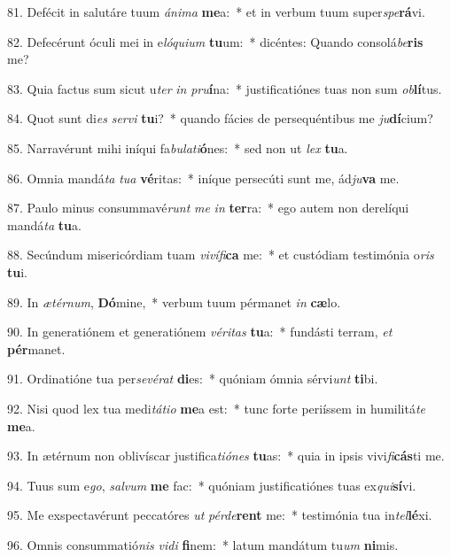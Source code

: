 81. Defécit in salutáre tuum \textit{á}\textit{ni}\textit{ma} \textbf{me}a:~*  et in verbum tuum super\textit{spe}\textbf{rá}vi.\

82. Defecérunt óculi mei in e\textit{ló}\textit{qui}\textit{um} \textbf{tu}um:~*  dicéntes: Quando consolá\textit{be}\textbf{ris} me?\

83. Quia factus sum sicut u\textit{ter} \textit{in} \textit{pru}\textbf{í}na:~*  justificatiónes tuas non sum \textit{ob}\textbf{lí}tus.\

84. Quot sunt di\textit{es} \textit{ser}\textit{vi} \textbf{tu}i?~*  quando fácies de persequéntibus me \textit{ju}\textbf{dí}cium?\

85. Narravérunt mihi iníqui fa\textit{bu}\textit{la}\textit{ti}\textbf{ó}nes:~*  sed non ut \textit{lex} \textbf{tu}a.\

86. Omnia mandá\textit{ta} \textit{tu}\textit{a} \textbf{vé}ritas:~*  iníque persecúti sunt me, ád\textit{ju}\textbf{va} me.\

87. Paulo minus consummavé\textit{runt} \textit{me} \textit{in} \textbf{ter}ra:~*  ego autem non derelíqui mandá\textit{ta} \textbf{tu}a.\

88. Secúndum misericórdiam tuam \textit{vi}\textit{ví}\textit{fi}\textbf{ca} me:~*  et custódiam testimónia o\textit{ris} \textbf{tu}i.\

89. In \textit{æ}\textit{tér}\textit{num}, \textbf{Dó}mine,~*  verbum tuum pérmanet \textit{in} \textbf{cæ}lo.\

90. In generatiónem et generatiónem \textit{vé}\textit{ri}\textit{tas} \textbf{tu}a:~*  fundásti terram, \textit{et} \textbf{pér}manet.\

91. Ordinatióne tua per\textit{se}\textit{vé}\textit{rat} \textbf{di}es:~*  quóniam ómnia sérvi\textit{unt} \textbf{ti}bi.\

92. Nisi quod lex tua medi\textit{tá}\textit{ti}\textit{o} \textbf{me}a est:~*  tunc forte periíssem in humilitá\textit{te} \textbf{me}a.\

93. In ætérnum non oblivíscar justifica\textit{ti}\textit{ó}\textit{nes} \textbf{tu}as:~*  quia in ipsis vivi\textit{fi}\textbf{cás}ti me.\

94. Tuus sum e\textit{go}, \textit{sal}\textit{vum} \textbf{me} fac:~*  quóniam justificatiónes tuas ex\textit{qui}\textbf{sí}vi.\

95. Me exspectavérunt peccatóres \textit{ut} \textit{pér}\textit{de}\textbf{rent} me:~*  testimónia tua in\textit{tel}\textbf{lé}xi.\

96. Omnis consummatió\textit{nis} \textit{vi}\textit{di} \textbf{fi}nem:~*  latum mandátum tu\textit{um} \textbf{ni}mis.\

